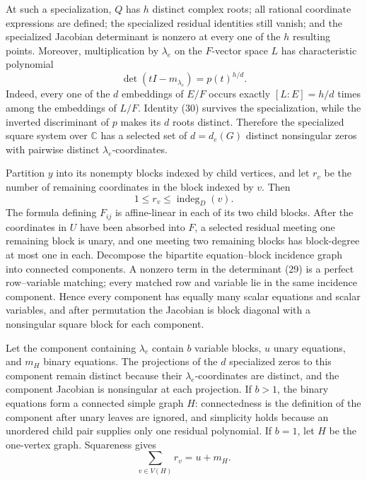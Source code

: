 At such a specialization, \(Q\) has \(h\) distinct complex roots; all rational coordinate expressions are defined; the specialized residual identities still vanish; and the specialized Jacobian determinant is nonzero at every one of the \(h\) resulting points. Moreover, multiplication by \(\lambda_e\) on the \(F\)-vector space \(L\) has characteristic polynomial
\[
 \det(tI-m_{\lambda_e})=p(t)^{h/d}.
\tag{30}
\]
Indeed, every one of the \(d\) embeddings of \(E/F\) occurs exactly \([L:E]=h/d\) times among the embeddings of \(L/F\). Identity (30) survives the specialization, while the inverted discriminant of \(p\) makes its \(d\) roots distinct. Therefore the specialized square system over \(\mathbb C\) has a selected set of \(d=d_e(G)\) distinct nonsingular zeros with pairwise distinct \(\lambda_e\)-coordinates.

Partition \(y\) into its nonempty blocks indexed by child vertices, and let \(r_v\) be the number of remaining coordinates in the block indexed by \(v\). Then
\[
 1\leq r_v\leq\operatorname{indeg}_D(v).
\tag{31}
\]
The formula defining \(F_{ij}\) is affine-linear in each of its two child blocks. After the coordinates in \(U\) have been absorbed into \(F\), a selected residual meeting one remaining block is unary, and one meeting two remaining blocks has block-degree at most one in each. Decompose the bipartite equation--block incidence graph into connected components. A nonzero term in the determinant (29) is a perfect row--variable matching; every matched row and variable lie in the same incidence component. Hence every component has equally many scalar equations and scalar variables, and after permutation the Jacobian is block diagonal with a nonsingular square block for each component.

Let the component containing \(\lambda_e\) contain \(b\) variable blocks, \(u\) unary equations, and \(m_H\) binary equations. The projections of the \(d\) specialized zeros to this component remain distinct because their \(\lambda_e\)-coordinates are distinct, and the component Jacobian is nonsingular at each projection. If \(b>1\), the binary equations form a connected simple graph \(H\): connectedness is the definition of the component after unary leaves are ignored, and simplicity holds because an unordered child pair supplies only one residual polynomial. If \(b=1\), let \(H\) be the one-vertex graph. Squareness gives
\[
 \sum_{v\in V(H)}r_v=u+m_H.
\tag{32}
\]

